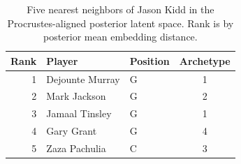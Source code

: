 \begin{table}[htbp]
  \centering\small
  \begin{tabular}{rllc}
    \toprule
    Rank & Player & Position & Archetype \\
    \midrule
    1 & Dejounte Murray & G & 1 \\
    2 & Mark Jackson & G & 2 \\
    3 & Jamaal Tinsley & G & 1 \\
    4 & Gary Grant & G & 4 \\
    5 & Zaza Pachulia & C & 3 \\
    \bottomrule
  \end{tabular}
  \caption{Five nearest neighbors of Jason Kidd in the Procrustes-aligned posterior latent space. Rank is by posterior mean embedding distance.}
  \label{tab:Jason_Kidd_neighbors}
\end{table}

